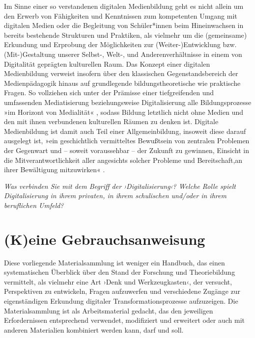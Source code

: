 \documentclass[
  a4paper,
]{book}
\begin{document}
Im Sinne einer so verstandenen digitalen Medienbildung geht es nicht allein um den Erwerb von Fähigkeiten und Kenntnissen zum kompetenten Umgang mit digitalen Medien oder die Begleitung von Schüler*innen beim Hineinwachsen in bereits bestehende Strukturen und Praktiken, als vielmehr um die (gemeinsame) Erkundung und Erprobung der Möglichkeiten zur (Weiter-)Entwicklung bzw. (Mit-)Gestaltung unserer Selbst-, Welt-, und Anderenverhältnisse in einem von Digitalität geprägten kulturellen Raum. Das Konzept einer digitalen Medienbildung verweist insofern über den klassischen Gegenstandsbereich der Medienpädagogik hinaus auf grundlegende bildungstheoretische wie praktische Fragen. So vollziehen sich unter der Prämisse einer tiefgreifenden und umfassenden Mediatisierung beziehungsweise Digitalisierung alle Bildungsprozesse »im Horizont von Medialität« \citep{jorissenMedienbildungBegriffsverstandnisseUnd2011}, sodass Bildung letztlich nicht ohne Medien und den mit ihnen verbundenen kulturellen Räumen zu denken ist. Digitale Medienbildung ist damit auch Teil einer Allgemeinbildung, insoweit diese darauf ausgelegt ist, »ein geschichtlich vermitteltes Bewußtsein von zentralen Problemen der Gegenwart und -- soweit voraussehbar -- der Zukunft zu gewinnen, Einsicht in die Mitverantwortlichkeit aller angesichts solcher Probleme und Bereitschaft,an ihrer Bewältigung mitzuwirken« \citep[S. 56]{klafkiNeueStudienZur2007}.

\begin{blackbox}
\emph{Was verbinden Sie mit dem Begriff der ›Digitalisierung‹? Welche Rolle spielt Digitalisierung in ihrem privaten, in ihrem schulischen und/oder in ihrem beruflichen Umfeld?}

\end{blackbox}

\section{(K)eine Gebrauchsanweisung}\label{keine-gebrauchsanweisung}

Diese vorliegende Materialsammlung ist weniger ein Handbuch, das einen systematischen Überblick über den Stand der Forschung und Theoriebildung vermittelt, als vielmehr eine Art ›Denk und Werkzeugkasten‹, der versucht, Perspektiven zu entwickeln, Fragen aufzuwerfen und verschiedene Zugänge zur eigenständigen Erkundung digitaler Transformationsprozesse aufzuzeigen. Die Materialsammlung ist als Arbeitsmaterial gedacht, das den jeweiligen Erfordernissen entsprechend verwendet, modifiziert und erweitert oder auch mit anderen Materialien kombiniert werden kann, darf und soll.
\end{document}

